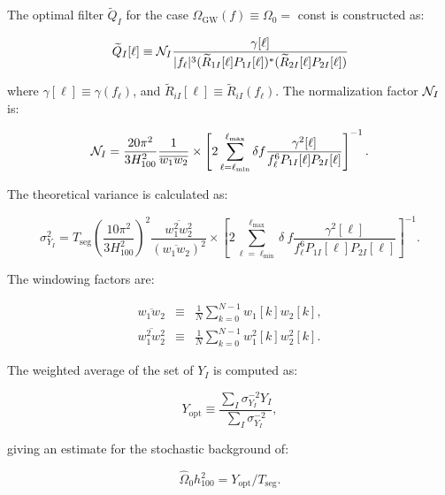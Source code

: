 The optimal filter $\widetilde Q_I$ for the case
$\Omega_{\mathrm{GW}}(f) \equiv \Omega_0 = $ const is constructed as:

\begin{equation}
\widetilde Q_I[\ell] \equiv {\cal N}_I \frac{\gamma[\ell]}{|f_\ell|^3
(\widetilde R_{1I}[\ell] P_{1I}[\ell])^{\ast} (\widetilde R_{2I}[\ell]
P_{2I}[\ell])}
\end{equation}

where $\gamma[\ell] \equiv \gamma(f_\ell)$, and $\widetilde R_{iI}[\ell]
\equiv \widetilde R_{iI}(f_\ell)$. The normalization factor ${\cal N}_I$
is:

\begin{equation}
{\cal N}_I = \frac{20\pi^2}{3H_{100}^2} \frac{1}{\overline{w_1w_2}}
\times \left[2 \sum_{\ell = \ell_{\mathrm{min}}}^{\ell_{\mathrm{max}}}
\delta f \frac{\gamma^2[\ell]}{f_\ell^6 P_{1I}[\ell] P_{2I}[\ell]}
\right]^{-1}.
\end{equation}

The theoretical variance is calculated as:

\begin{equation}
\sigma_{Y_{I}}^2 = T_{\mathrm{seg}} \left( \frac{10 \pi^2}{3 H_{100}^2}
\right)^2 \frac{\overline{w_1^2 w_2^2}}{(\overline{w_1w_2})^2} \times
\left[ 2 \sum_{\ell=\ell_{\mathrm{min}}}^{\ell_{\mathrm{max}}} \delta\ f
\frac{\gamma^2[\ell]}{f_\ell^6 P_{1I}[\ell] P_{2I}[\ell]} \right]^{-1}.
\end{equation}

The windowing factors are:

\begin{eqnarray}
\overline{w_1w_2} & \equiv & \frac{1}{N}\sum_{k=0}^{N-1}w_1[k]w_2[k], \\
\overline{w_1^2 w_2^2} & \equiv & \frac{1}{N}\sum_{k = 0}^{N -
	1}w_1^2[k] w_2^2[k].
\end{eqnarray}

The weighted average of the set of $Y_I$ is computed as:

\begin{equation}
Y_{\mathrm{opt}} \equiv \frac{\sum_I \sigma_{Y_{I}}^{-2} Y_{I}} {\sum_I
\sigma_{Y_{I}}^{-2}},
\end{equation}

giving an estimate for the stochastic background of:

\begin{equation}
\widehat \Omega_0 h^2_{100} = Y_{\mathrm{opt}}/T_{\mathrm{seg}}.
\end{equation}

